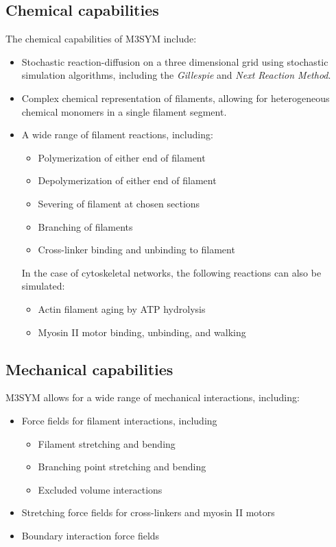 \documentclass[11pt, oneside]{article}   	%
\begin{document}
\subsection{Chemical capabilities}
 The chemical capabilities of M3SYM include:

\begin{itemize}

\item Stochastic reaction-diffusion on a three dimensional grid using stochastic simulation algorithms, including the \textit{Gillespie} and \textit{Next Reaction Method}.
\item Complex chemical representation of filaments, allowing for heterogeneous chemical monomers in a single filament segment.
\item A wide range of filament reactions, including:
\begin{itemize}
\item Polymerization of either end of filament
\item Depolymerization of either end of filament
\item Severing of filament at chosen sections
\item Branching of filaments
\item Cross-linker binding and unbinding to filament
\end{itemize}

\break
In the case of cytoskeletal networks, the following reactions can also be simulated:
\begin{itemize}
\item Actin filament aging by ATP hydrolysis
\item Myosin II motor binding, unbinding, and walking
\end{itemize}

\end{itemize}

\subsection{Mechanical capabilities}
M3SYM allows for a wide range of mechanical interactions, including:

\begin{itemize}
\item Force fields for filament interactions, including
\begin{itemize}
\item Filament stretching and bending
\item Branching point stretching and bending
\item Excluded volume interactions
\end{itemize}
\item Stretching force fields for cross-linkers and myosin II motors 
\item Boundary interaction force fields
\end{itemize}
\end{document}
